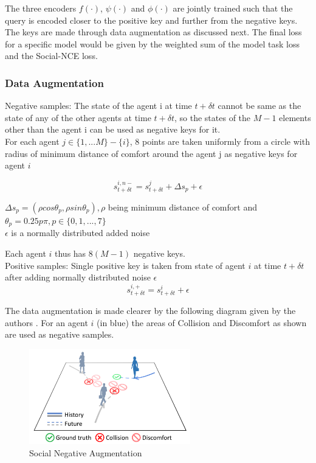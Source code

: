 {The three encoders $f(\cdot)$, $\psi(\cdot)$ and $\phi(\cdot)$ are jointly trained such that the query is encoded closer to the positive key and further from the negative keys. The keys are made through data augmentation as discussed next. The final loss for a specific model would be given by the weighted sum of the model task loss and the Social-NCE loss.

\subsubsection{Data Augmentation}
Negative samples: The state of the agent i at time $t + {\delta}t$ cannot be same as the state of any of the other agents at time $t + {\delta}t$, so the states of the $M - 1$ elements other than the agent i can be used as negative keys for it. \\
For each agent $j \in \{1,...M\} - \{i\}$, 8 points are taken uniformly from a circle with radius of minimum distance of comfort around the agent j as negative keys for agent $i$


\begin{equation}
s_{t+{\delta}t}^{i,n-} = s_{t+{\delta}t}^{j} + {\Delta}s_p + \epsilon
\end{equation}

${\Delta}s_p = ({\rho}cos{\theta}_p, {\rho}sin{\theta}_p), \rho$ being minimum distance of comfort and ${\theta}_p = 0.25p\pi, p \in \{0, 1,...,7\}$ \\
$\epsilon$ is a normally distributed added noise 


Each agent $i$ thus has $8(M - 1)$ negative keys.\\ 
Positive samples: Single positive key is taken from state of agent $i$ at time $t + {\delta}t$ after adding normally distributed noise $\epsilon$\\
\begin{equation}
s_{t+{\delta}t}^{i,+} = s_{t+{\delta}t}^{i} + \epsilon
\end{equation}

The data augmentation is made clearer by the following diagram given by the authors \cite {liu2020snce}. For an agent $i$ (in blue) the areas of Collision and Discomfort as shown are used as negative samples.
\begin{figure}[htp]
    \centering
    \includegraphics[width=7cm]{../openreview/illustration.png}
    \caption{Social Negative Augmentation}
    \label{fig:Social Negative Augmentation}
\end{figure}

}
